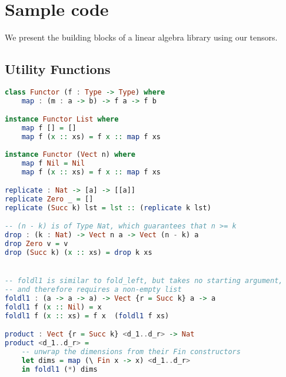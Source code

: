 \documentclass[12pt]{article}
\begin{document}
\section{Sample code}
We present the building blocks of a linear algebra library using our tensors.

\subsection{Utility Functions}
\begin{lstlisting}[language=Haskell]
class Functor (f : Type -> Type) where
    map : (m : a -> b) -> f a -> f b

instance Functor List where
	map f [] = []
	map f (x :: xs) = f x :: map f xs
	
instance Functor (Vect n) where
	map f Nil = Nil
	map f (x :: xs) = f x :: map f xs

replicate : Nat -> [a] -> [[a]]
replicate Zero _ = []
replicate (Succ k) lst = lst :: (replicate k lst)

-- (n - k) is of Type Nat, which guarantees that n >= k
drop : (k : Nat) -> Vect n a -> Vect (n - k) a
drop Zero v = v
drop (Succ k) (x :: xs) = drop k xs


-- foldl1 is similar to fold_left, but takes no starting argument, 
-- and therefore requires a non-empty list
foldl1 : (a -> a -> a) -> Vect {r = Succ k} a -> a
foldl1 f (x :: Nil) = x
foldl1 f (x :: xs) = f x  (foldl1 f xs)

product : Vect {r = Succ k} <d_1..d_r> -> Nat
product <d_1..d_r> =  
	-- unwrap the dimensions from their Fin constructors
	let dims = map (\ Fin x -> x) <d_1..d_r> 
	in foldl1 (*) dims


\end{lstlisting}
\end{document}
